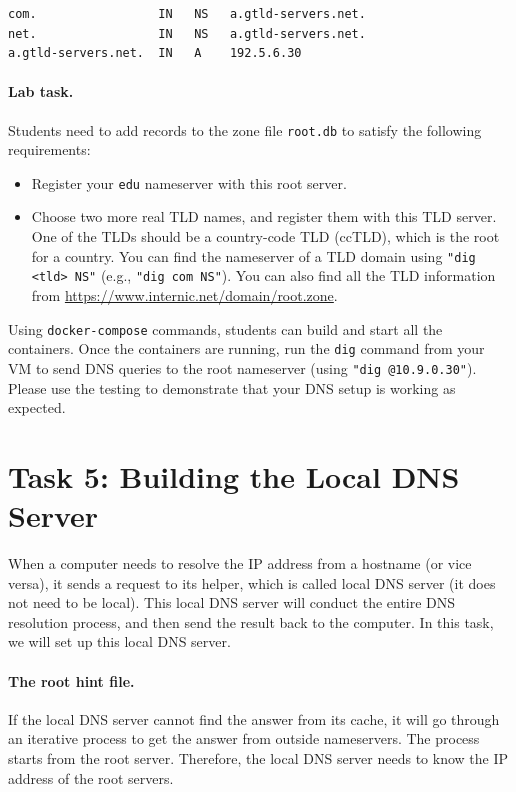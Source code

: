 \begin{lstlisting}
com.                 IN   NS   a.gtld-servers.net.
net.                 IN   NS   a.gtld-servers.net.
a.gtld-servers.net.  IN   A    192.5.6.30
\end{lstlisting}
 

\paragraph{Lab task.} Students need to add records to the 
zone file \texttt{root.db} to satisfy the following requirements:  

\begin{itemize}[nosep]
\item Register your \texttt{edu} nameserver with this root server.

\item Choose two more real TLD names, and register them
with this TLD server. One of the TLDs should be 
a country-code TLD (ccTLD), which is the root for 
a country. You can find the nameserver of a TLD domain
using \texttt{"dig <tld> NS"} (e.g., \texttt{"dig com NS"}).
You can also find all the TLD information from
\url{https://www.internic.net/domain/root.zone}.
\end{itemize}
 

Using \texttt{docker-compose} commands, students can
build and start all the containers. 
Once the containers are running,
run the \texttt{dig} command from your VM to
send DNS queries to the root nameserver (using 
\texttt{"dig @10.9.0.30"}). Please use the 
testing to demonstrate that your DNS setup 
is working as expected. 


\section{Task 5: Building the Local DNS Server} 

When a computer needs to resolve the IP address from a hostname (or vice versa),
it sends a request to its helper, which is called local DNS server (it
does not need to be local).  This local DNS server will conduct the 
entire DNS resolution process, and then send the result back to the computer. 
In this task, we will set up this local DNS server. 


\paragraph{The root hint file.}
If the local DNS server cannot find the answer from its cache, it 
will go through an iterative process to get the answer from outside 
nameservers.  The process starts from the root server. 
Therefore, the local DNS server needs to
know the IP address of the root servers. 


